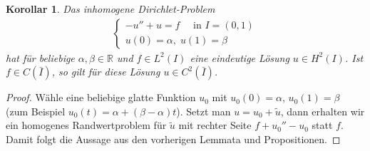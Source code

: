 \documentclass[twoside]{article}
\newtheorem{corollary}[theorem]{Korollar}
\theoremstyle{definition}
\begin{document}
\begin{corollary} Das inhomogene Dirichlet-Problem
\begin{align}
\begin{cases}
-u'' + u = f \quad \text{ in } I = (0,1)\\
u(0)= \alpha, \;  u(1) = \beta
\end{cases}
\end{align}
hat für beliebige $\alpha,\beta \in \mathbb{R}$ und $f \in L^2(I)$ eine eindeutige Lösung $u \in H^2(I)$. Ist $f \in C(\bar{I})$, so gilt für diese Lösung $u \in C^2(\bar{I})$.
\end{corollary}
\begin{proof}
Wähle eine beliebige glatte Funktion $u_0$ mit $u_0(0) = \alpha$, $u_0(1)=\beta$ (zum Beispiel $u_0(t) = \alpha + (\beta - \alpha ) t$). Setzt man $u = u_0 + \tilde{u}$, dann erhalten wir ein homogenes Randwertproblem für $\tilde{u}$ mit rechter Seite $f + u_0'' - u_0$ statt $f$. Damit folgt die Aussage aus den vorherigen Lemmata und Propositionen.
\end{proof}
\end{document}
